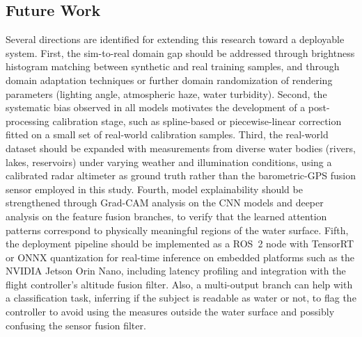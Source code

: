 \subsection{Future Work}

Several directions are identified for extending this research toward a deployable system. First, the sim-to-real domain gap should be addressed through brightness histogram matching between synthetic and real training samples, and through domain adaptation techniques or further domain randomization of rendering parameters (lighting angle, atmospheric haze, water turbidity). Second, the systematic bias observed in all models motivates the development of a post-processing calibration stage, such as spline-based or piecewise-linear correction fitted on a small set of real-world calibration samples. Third, the real-world dataset should be expanded with measurements from diverse water bodies (rivers, lakes, reservoirs) under varying weather and illumination conditions, using a calibrated radar altimeter as ground truth rather than the barometric-GPS fusion sensor employed in this study. Fourth, model explainability should be strengthened through Grad-CAM analysis on the CNN models and deeper analysis on the feature fusion branches, to verify that the learned attention patterns correspond to physically meaningful regions of the water surface. Fifth, the deployment pipeline should be implemented as a ROS~2 node with TensorRT or ONNX quantization for real-time inference on embedded platforms such as the NVIDIA Jetson Orin Nano, including latency profiling and integration with the flight controller's altitude fusion filter. Also, a multi-output branch can help with a classification task, inferring if the subject is readable as water or not, to flag the controller to avoid using the measures outside the water surface and possibly confusing the sensor fusion filter.